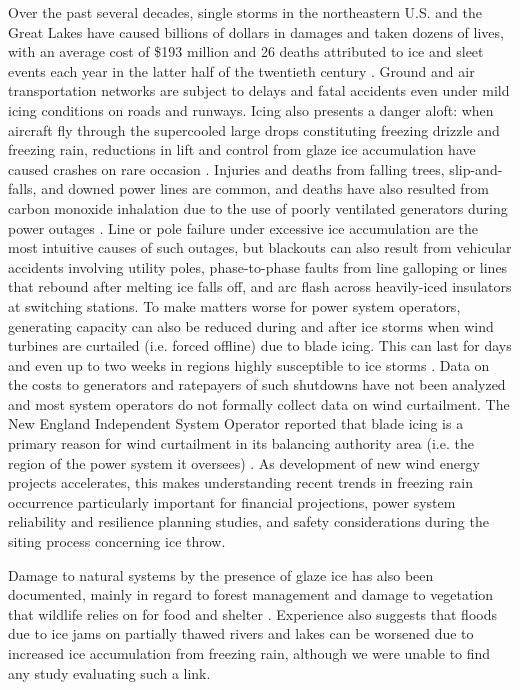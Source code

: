 \documentclass[twocol]{ametsoc}
\begin{document}
Over the past several decades, single storms in the northeastern U.S. and the Great Lakes have caused billions of dollars in damages and taken dozens of lives, with an average cost of \$193 million and 26 deaths attributed to ice and sleet events each year in the latter half of the twentieth century \citep{lott2006tracking, changnon2006severe, ncei2019storm}. Ground and air transportation networks are subject to delays and fatal accidents even under mild icing conditions on roads and runways. Icing also presents a danger aloft: when aircraft fly through the supercooled large drops constituting freezing drizzle and freezing rain, reductions in lift and control from glaze ice accumulation have caused crashes on rare occasion \citep{bernstein2000freezing}. Injuries and deaths from falling trees, slip-and-falls, and downed power lines are common, and deaths have also resulted from carbon monoxide inhalation due to the use of poorly ventilated generators during power outages \citep{daley2000outbreak}. Line or pole failure under excessive ice accumulation are the most intuitive causes of such outages, but blackouts can also result from vehicular accidents involving utility poles, phase-to-phase faults from line galloping or lines that rebound after melting ice falls off, and arc flash across heavily-iced insulators at switching stations. To make matters worse for power system operators, generating capacity can also be reduced during and after ice storms when wind turbines are curtailed (i.e. forced offline) due to blade icing. This can last for days and even up to two weeks in regions highly susceptible to ice storms \citep{davis2014forecast}. Data on the costs to generators and ratepayers of such shutdowns have not been analyzed and most system operators do not formally collect data on wind curtailment. The New England Independent System Operator reported that blade icing is a primary reason for wind curtailment in its balancing authority area (i.e. the region of the power system it oversees) \citep{bird2014wind}. As development of new wind energy projects accelerates, this makes understanding recent trends in freezing rain occurrence particularly important for financial projections, power system reliability and resilience planning studies, and safety considerations during the siting process concerning ice throw. 

Damage to natural systems by the presence of glaze ice has also been documented, mainly in regard to forest management and damage to vegetation that wildlife relies on for food and shelter \citep{pellikka2000modelling,proulx2001relationship}. Experience also suggests that floods due to ice jams on partially thawed rivers and lakes can be worsened due to increased ice accumulation from freezing rain, although we were unable to find any study evaluating such a link. 
\end{document}

